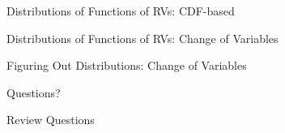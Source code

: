 \documentclass[handout,fleqn,aspectratio=169]{beamer}
\begin{document}
\begin{frame}{Distributions of Functions of RVs: CDF-based}

\plitemsep 0.1in

\bci 

\item 

\eci
\end{frame}

\begin{frame}{Distributions of Functions of RVs: Change of Variables}

\plitemsep 0.1in

\bci 

\item 

\eci
\end{frame}

\begin{frame}{Figuring Out Distributions: Change of Variables}

\plitemsep 0.1in

\bci 

\item 

\eci
\end{frame}



\begin{frame}{}
\vspace{2cm}
\LARGE Questions?


\end{frame}

\begin{frame}{Review Questions}
\bce[1)]
\item 

\ece
\end{frame}
\end{document}
